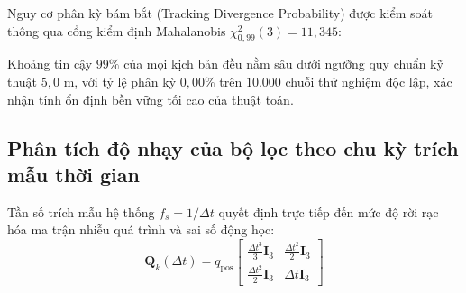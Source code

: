 Nguy cơ phân kỳ bám bắt (Tracking Divergence Probability) được kiểm soát thông qua cổng kiểm định Mahalanobis $\chi^2_{0{,}99}(3) = 11{,}345$:

\begin{table}[H]
\centering
\caption{Bảng ước lượng khoảng tin cậy Monte Carlo 99\% và tỷ lệ phân kỳ bám bắt trên 9 kịch bản}
\label{tab:monte-carlo-99-ci-table}
\end{table}

Khoảng tin cậy $99\%$ của mọi kịch bản đều nằm sâu dưới ngưỡng quy chuẩn kỹ thuật $5{,}0$ m, với tỷ lệ phân kỳ $0{,}00\%$ trên $10.000$ chuỗi thử nghiệm độc lập, xác nhận tính ổn định bền vững tối cao của thuật toán.

\subsection{Phân tích độ nhạy của bộ lọc theo chu kỳ trích mẫu thời gian}

\hspace{0.5cm} Tần số trích mẫu hệ thống $f_s = 1/\Delta t$ quyết định trực tiếp đến mức độ rời rạc hóa ma trận nhiễu quá trình và sai số động học:
\begin{equation}
\mathbf{Q}_k(\Delta t) = q_{\text{pos}} \begin{bmatrix}
\frac{\Delta t^3}{3}\mathbf{I}_3 & \frac{\Delta t^2}{2}\mathbf{I}_3 \\
\frac{\Delta t^2}{2}\mathbf{I}_3 & \Delta t\mathbf{I}_3
\end{bmatrix}
\label{eq:process-noise-dt-scaling-w13}
\end{equation}

